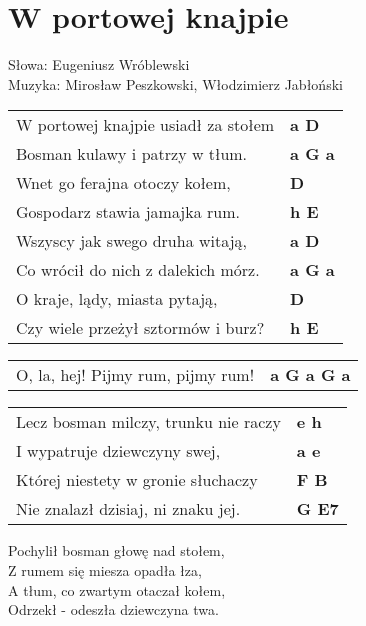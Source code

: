 \section{W portowej knajpie}

Słowa: Eugeniusz Wróblewski\\
Muzyka: Mirosław Peszkowski, Włodzimierz Jabłoński

\vspace{2em}
\begin{tabular}{@{}p{7cm}@{}l@{}}
W portowej knajpie usiadł za stołem  & \bfseries   a D \\
Bosman kulawy i patrzy w tłum.  & \bfseries   a G a \\
Wnet go ferajna otoczy kołem,  & \bfseries   D \\
Gospodarz stawia jamajka rum.  & \bfseries   h E \\
Wszyscy jak swego druha witają,  & \bfseries   a D \\
Co wrócił do nich z dalekich mórz.  & \bfseries   a G a \\
O kraje, lądy, miasta pytają,  & \bfseries   D \\
Czy wiele przeżył sztormów i burz?  & \bfseries   h E \\
\end{tabular}

\vspace{1em}
\begin{tabular}{@{}p{7cm}@{}l@{}}
O, la, hej! Pijmy rum, pijmy rum!  & \bfseries   a G a G a \\
\end{tabular}

\vspace{1em}
\begin{tabular}{@{}p{7cm}@{}l@{}}
Lecz bosman milczy, trunku nie raczy  & \bfseries   e h \\
I wypatruje dziewczyny swej,  & \bfseries   a e \\
Której niestety w gronie słuchaczy  & \bfseries   F B \\
Nie znalazł dzisiaj, ni znaku jej.  & \bfseries   G E7 \\
\end{tabular}

\vspace{1em}
Pochylił bosman głowę nad stołem, \\
Z rumem się miesza opadła łza, \\
A tłum, co zwartym otaczał kołem, \\
Odrzekł - odeszła dziewczyna twa. \\


